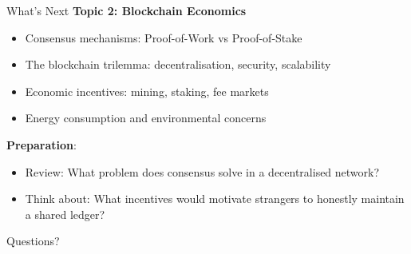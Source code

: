 \documentclass[10pt]{beamer}
\begin{document}
\begin{frame}{What's Next}
  \textbf{Topic 2: Blockchain Economics}
  \begin{itemize}
    \item Consensus mechanisms: Proof-of-Work vs Proof-of-Stake
    \item The blockchain trilemma: decentralisation, security, scalability
    \item Economic incentives: mining, staking, fee markets
    \item Energy consumption and environmental concerns
  \end{itemize}
  
  \vspace{1em}
  \textbf{Preparation}:
  \begin{itemize}
    \item Review: What problem does consensus solve in a decentralised network?
    \item Think about: What incentives would motivate strangers to honestly maintain a shared ledger?
  \end{itemize}
\end{frame}

\begin{frame}[plain]
  \vfill
  \begin{center}
    {\Large Questions?}
  \end{center}
  \vfill
\end{frame}
\end{document}
